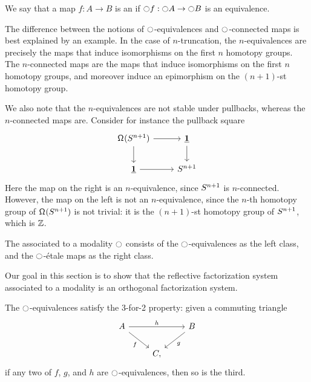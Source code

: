 \documentclass[9pt,twosided]{amsart}
\begin{document}
\begin{defn}
We say that a map $f:A\to B$ is an  if ${\ocircle} f:{\ocircle} A\to {\ensuremath{\ocircle}} B$ is an equivalence.
\end{defn}

\begin{rmk}
The difference between the notions of ${\ocircle}$-equivalences and ${\ocircle}$-connected maps is best explained by an example. In the case of $n$-truncation, the $n$-equivalences are precisely the maps that induce isomorphisms on the first $n$ homotopy groups. The $n$-connected maps are the maps that induce isomorphisms on the first $n$ homotopy groups, and moreover induce an epimorphism on the $(n+1)$-st homotopy group. 

We also note that the $n$-equivalences are not stable under pullbacks, whereas the $n$-connected maps are. Consider for instance the pullback square
\begin{equation*}
\begin{tikzcd}
\loopspace {\sphere{n+1}} \arrow[r] \arrow[d] & \unit \arrow[d] \\
\unit\arrow[r] & \sphere{n+1}
\end{tikzcd}
\end{equation*}
Here the map on the right is an $n$-equivalence, since $S^{n+1}$ is $n$-connected. However, the map on the left is not an $n$-equivalence, since the $n$-th homotopy group of $\mathsf{\Omega}^{}(S^{n+1})$ is not trivial: it is the $(n+1)$-st homotopy group of $S^{n+1}$, which is $\mathbb{Z}$.
\end{rmk}

\begin{defn}
The  associated to a modality ${\ocircle}$ consists of the ${\ocircle}$-equivalences as the left class, and the ${\ocircle}$-\'etale maps as the right class.
\end{defn}

Our goal in this section is to show that the reflective factorization system associated to a modality is an orthogonal factorization system.

\begin{lem}\label{lem:3for2_mequiv}
The ${\ocircle}$-equivalences satisfy the 3-for-2 property: given a commuting triangle
\begin{equation*}
\begin{tikzcd}
A \arrow[rr,"h"] \arrow[dr,swap,"f"] & & B \arrow[dl,"g"] \\
& C,
\end{tikzcd}
\end{equation*}
if any two of $f$, $g$, and $h$ are ${\ocircle}$-equivalences, then so is the third.
\end{lem}
\end{document}
